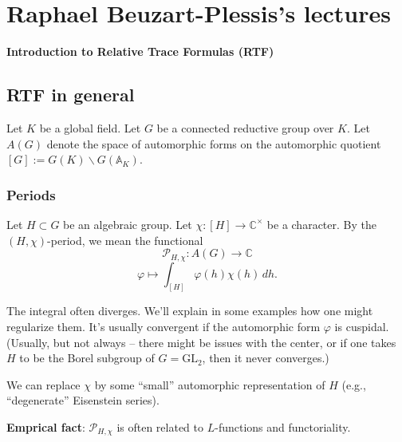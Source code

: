 \documentclass[reqno]{amsart} 
\numberwithin{theorem}{section}
\numberwithin{equation}{section}
\numberwithin{exercise}{section}
\begin{document}
\section{Raphael Beuzart-Plessis's lectures}\label{sec:cq6tho1cgx}
\textbf{Introduction to Relative Trace Formulas (RTF)}

\subsection{RTF in general}\label{sec:cq6tho1blx}

Let $K$ be a global field.  Let $G$ be a connected reductive group over $K$.  Let $A(G)$ denote the space of automorphic forms on the automorphic quotient $[G] := G(K) \backslash G(\mathbb{A}_K)$.

\subsubsection{Periods}\label{sec:cq6tho1auw}

Let $H \subset G$ be an algebraic group.  Let $\chi :[H] \rightarrow \mathbb{C}^\times$ be a character.  By the $(H, \chi)$-period, we mean the functional
\begin{equation*}
  \mathcal{P}_{H, \chi} : A(G) \rightarrow \mathbb{C}
\end{equation*}
\begin{equation*}
  \varphi \mapsto \int_{[H]} \varphi(h) \chi(h) \, d h.
\end{equation*}
\begin{remark}\label{remark:cq6tho091q}
  The integral often diverges.  We'll explain in some examples how one might regularize them.  It's usually convergent if the automorphic form $\varphi$ is cuspidal.  (Usually, but not always -- there might be issues with the center, or if one takes $H$ to be the Borel subgroup of $G = \mathrm{GL}_2$, then it never converges.)
\end{remark}

\begin{remark}\label{remark:cq6tho3lbh}
  We can replace $\chi$ by some ``small'' automorphic representation of $H$ (e.g., ``degenerate'' Eisenstein series).
\end{remark}

\textbf{Emprical fact}: $\mathcal{P}_{H, \chi}$ is often related to $L$-functions and functoriality.
\end{document}
